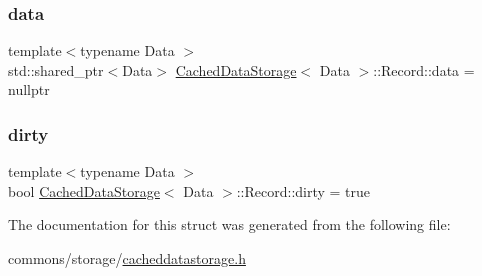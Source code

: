 \mbox{\label{struct_cached_data_storage_1_1_record_a4aeb7d0678c2435f346c6293204945fb}} 
\subsubsection{\texorpdfstring{data}{data}}
{\footnotesize\ttfamily template$<$typename Data $>$ \\
std\+::shared\+\_\+ptr$<$Data$>$ \mbox{\hyperlink{class_cached_data_storage}{Cached\+Data\+Storage}}$<$ Data $>$\+::Record\+::data = nullptr}

\mbox{\label{struct_cached_data_storage_1_1_record_a514f4e4343610f1c1006d838c0aa6432}} 
\subsubsection{\texorpdfstring{dirty}{dirty}}
{\footnotesize\ttfamily template$<$typename Data $>$ \\
bool \mbox{\hyperlink{class_cached_data_storage}{Cached\+Data\+Storage}}$<$ Data $>$\+::Record\+::dirty = true}



The documentation for this struct was generated from the following file\+:\begin{DoxyCompactItemize}
\item 
commons/storage/\mbox{\hyperlink{cacheddatastorage_8h}{cacheddatastorage.\+h}}\end{DoxyCompactItemize}
